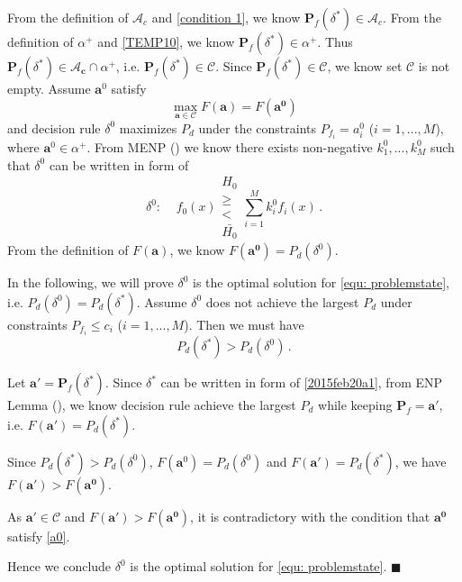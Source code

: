 From the definition of $\mathcal{A}_c$ and \eqref{condition 1}, we know $\mathbf{P}_f(\delta^\ast) \in \mathcal{A}_c$. 
From the definition of $\alpha^+$ and \eqref{TEMP10}, we know $\mathbf{P}_f(\delta^\ast) \in \alpha^+$. 
Thus $\mathbf{P}_f(\delta^\ast) \in \mathcal{A}_\mathbf{c} \cap \alpha^+$, i.e. $\mathbf{P}_f(\delta^\ast) \in \mathcal{C}$. Since  $\mathbf{P}_f(\delta^\ast) \in \mathcal{C}$, we know set $\mathcal{C}$ is not empty.
Assume $\mathbf{a}^0$ satisfy
\begin{equation}
\label{a0}
\max_{\mathbf{a}\in\mathcal{C}} F(\mathbf{a}) = F(\mathbf{a^0})
\end{equation}
and decision rule $\delta^0$ maximizes $P_d$ under the constraints $P_{f_i} = a^0_i$ ($i = 1, ..., M$), where $\mathbf{a}^0 \in \alpha^+$. From MENP () we know there exists non-negative $k_1^0, ..., k_M^0$ such that $\delta^0$ can be written in form of 
\[
\delta^0:\;\;\;\;f_0(x) \substack{H_0 \\ \geq \\ < \\ \bar{H_0}} \sum_{i=1}^{M}k_i^0f_i(x)\,.
\] 
From the definition of $F(\mathbf{a})$, we know $F(\mathbf{a^0}) = P_d(\delta^0)$.

In the following, we  will prove $\delta^0$ is the optimal solution for \eqref{equ: problemstate}, i.e. $P_d(\delta^0) = P_d(\delta^\ast)$. 
Assume  $\delta^0$ does not achieve the largest $P_d$ under constraints $P_{f_i} \leq c_i$ ($i=1, ..., M$). Then  we must have 
\begin{equation}
\label{condition 2}
P_{d}(\delta^\ast) > P_d(\delta^0)\,.
\end{equation}

Let $\mathbf{a}' = \mathbf{P}_f(\delta^\ast)$. 
Since $\delta^\ast$ can be written in form of \eqref{2015feb20a1}, from ENP Lemma (), we know decision rule achieve the largest $P_d$ while keeping $\mathbf{P}_f = \mathbf{a}'$, i.e.  
$F(\mathbf{a}') = P_d(\delta^\ast)$. 

Since $P_d(\delta^\ast) > P_d(\delta^0)$, $F(\mathbf{a}^0) = P_d(\delta^0)$ and  $F(\mathbf{a}') = P_d(\delta^\ast)$, we have $F(\mathbf{a'}) > F(\mathbf{a^0})$. 

As $\mathbf{a}' \in \mathcal{C}$ and $F(\mathbf{a'}) > F(\mathbf{a^0})$, it is contradictory with the condition that $\mathbf{a^0}$ satisfy \eqref{a0}.

Hence we conclude $\delta^0$ is the optimal solution for \eqref{equ: problemstate}. $\blacksquare$

